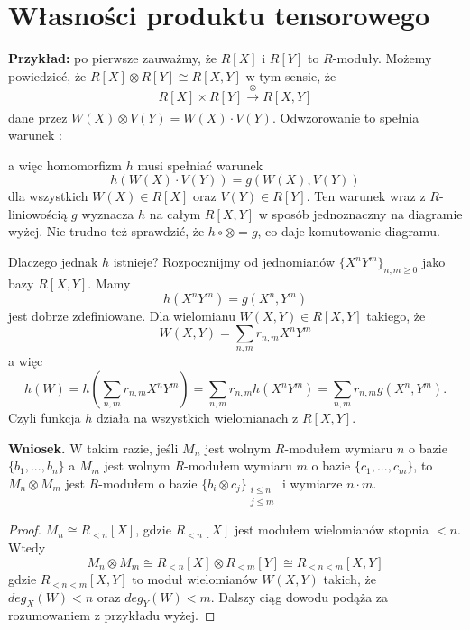 \section{Własności produktu tensorowego}

\textbf{Przykład:} po pierwsze zauważmy, że $R[X]$ i $R[Y]$ to $R$-moduły. Możemy powiedzieć, że $R[X]\otimes R[Y]\cong R[X, Y]$ w tym sensie, że
$$R[X]\times R[Y]\xrightarrow[]{\otimes} R[X,Y]$$
dane przez $W(X)\otimes V(Y)=W(X)\cdot V(Y)$. Odwzorowanie to spełnia warunek \hyperref[warunek:z:12.3]{{\color{purple}\PHcat}}:

\begin{center}\end{center}
a więc homomorfizm $h$ musi spełniać warunek
$$h(W(X)\cdot V(Y))=g(W(X), V(Y))$$
dla wszystkich $W(X)\in R[X]$ oraz $V(Y)\in R[Y]$. Ten warunek wraz z $R$-liniowością $g$ wyznacza $h$ na całym $R[X, Y]$ w sposób jednoznaczny na diagramie wyżej. Nie trudno też sprawdzić, że $h\circ \otimes=g$, co daje komutowanie diagramu.

Dlaczego jednak $h$ istnieje? Rozpocznijmy od jednomianów $\{X^nY^m\}_{n,m\geq0}$ jako bazy $R[X,Y]$. Mamy
$$h(X^nY^m)=g(X^n,Y^m)$$
jest dobrze zdefiniowane. Dla wielomianu $W(X,Y)\in R[X, Y]$ takiego, że
$$W(X,Y)=\sum_{n,m}r_{n,m}X^nY^m$$
a więc
$$h(W)=h(\sum_{n,m}r_{n,m}X^nY^m)=\sum_{n,m}r_{n,m}h(X^nY^m)=\sum_{n,m}r_{n,m}g(X^n,Y^m).$$
Czyli funkcja $h$ działa na wszystkich wielomianach z $R[X,Y]$.
\medskip

\textbf{\large\color{blue}Wniosek.} W takim razie, jeśli $M_n$ jest wolnym $R$-modułem wymiaru $n$ o bazie $\{b_1,...,b_n\}$ a $M_m$ jest wolnym $R$-modułem wymiaru $m$ o bazie $\{c_1,...,c_m\}$, to $M_n\otimes M_m$ jest $R$-modułem o bazie $\{b_i\otimes c_j\}_{\substack{i\leq n\\j\leq m}}$ i wymiarze $n\cdot m$.

\begin{proof}
  $M_n\cong R_{<n}[X]$, gdzie $R_{<n}[X]$ jest modułem wielomianów stopnia $<n$. Wtedy
  $$M_n\otimes M_m\cong R_{<n}[X]\otimes R_{<m}[Y]\cong R_{<n<m}[X, Y]$$
  gdzie $R_{<n<m}[X,Y]$ to moduł wielomianów $W(X, Y)$ takich, że $deg_X(W)<n$ oraz $deg_Y(W)<m$. Dalszy ciąg dowodu podąża za rozumowaniem z przykładu wyżej.
\end{proof}

